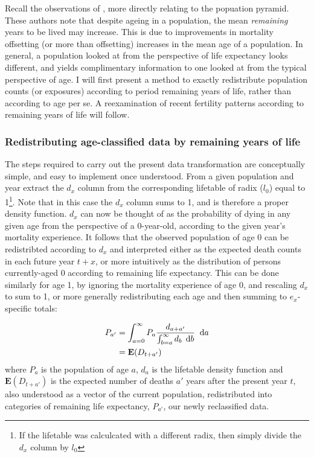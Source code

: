 
Recall the observations of \citet{sanderson2005average}, more directly
relating to the popuation pyramid. These authors note that despite ageing in a
population, the mean \textit{remaining} years to be lived may increase. This is due 
to improvements in mortality offsetting (or more than offsetting) increases in
the mean age of a population. In general, a population looked at from the
perspective of life expectancy looks different, and yields complimentary
information to one looked at from the typical perspective of age. I will first
present a method to exactly redistribute population counts (or exposures) according to 
period remaining years of life, rather than according to age per se. A
reexamination of recent fertility patterns according to remaining years of life
will follow.

\subsubsection{Redistributing age-classified data by remaining years of life}
The steps required to carry out the present data transformation are conceptually
simple, and easy to implement once understood. From a given
population and year extract the $d_x$ column from the corresponding lifetable of
radix ($l_0$) equal to 1\footnote{If the lifetable was calculcated with a
different radix, then simply divide the $d_x$ column by $l_0$}. Note that in
this case the $d_x$ column sums to 1, and is therefore a proper density function. 
$d_x$ can now be thought of as the probability of dying in any given age from the
 perspective of a 0-year-old, according to the given year's mortality experience. 
 It follows that the observed population of age 0 can be redistribted according to
  $d_x$ and interpreted either as the expected death counts in each future year
$t+x$, or more intuitively as the distribution of persons currently-aged 0 according 
to remaining life expectancy. This can be done similarly for age 1, by ignoring the 
mortality experience of age 0, and rescaling $d_x$ to
sum to 1, or more generally redistributing each age and then summing to
$e_x$-specific totals:

\begin{align}
\label{eq:dxredist}
P_{a'} &= \int _{a = 0} ^{\infty} P_a \frac{d_{a + a'}}{\int _{b
= a} ^{\infty} d_b\, \; \mathrm{d} b} \;\; \mathrm{d} a
\\
&= \mathbf{E}(D_{t+a'}) \notag
\end{align}
where $P_a$ is the population of age $a$, $d_a$ is the
lifetable density function and $\mathbf{E}(D_{t+a'})$ is the expected number of
deaths $a'$ years after the present year $t$, also understood as a vector of the
current population, redistributed into categories of remaining life expectancy,
$P_{a'}$, our newly reclassified data.

